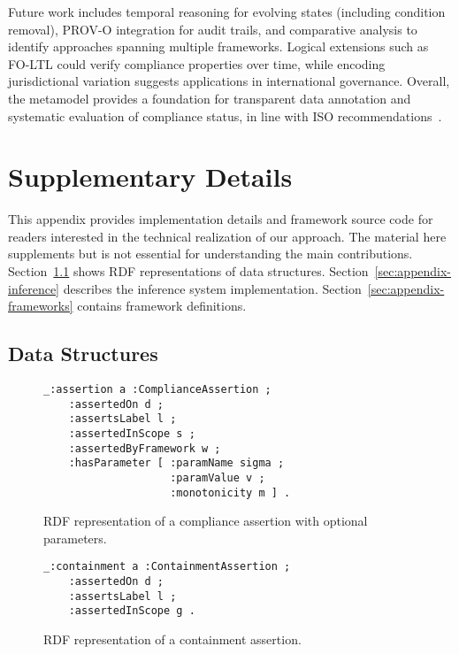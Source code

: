 \documentclass{IOS-Book-Article}
\begin{document}
Future work includes temporal reasoning for evolving states (including condition removal), PROV-O integration for audit trails, and comparative analysis to identify approaches spanning multiple frameworks. Logical extensions such as FO-LTL could verify compliance properties over time, while encoding jurisdictional variation suggests applications in international governance. Overall, the metamodel provides a foundation for transparent data annotation and systematic evaluation of compliance status, in line with ISO recommendations~\cite{iso19944,iso38505,iso27001}.





\newpage
\appendix
\section{Supplementary Details}

This appendix provides implementation details and framework source code for readers interested in the technical realization of our approach. The material here supplements but is not essential for understanding the main contributions. Section~\ref{sec:appendix-rdf} shows RDF representations of data structures. Section~\ref{sec:appendix-inference} describes the inference system implementation. Section~\ref{sec:appendix-frameworks} contains framework definitions.

\subsection{Data Structures}\label{sec:appendix-rdf}

\begin{figure}[ht]
\begin{lstlisting}[basicstyle=\ttfamily, frame=none]
_:assertion a :ComplianceAssertion ;
    :assertedOn d ;
    :assertsLabel l ;
    :assertedInScope s ;
    :assertedByFramework w ;
    :hasParameter [ :paramName sigma ;
                    :paramValue v ;
                    :monotonicity m ] .
\end{lstlisting}
\caption{RDF representation of a compliance assertion with optional parameters.}
\label{fig:appendix-compliance-assertion}
\end{figure}

\begin{figure}[ht]
\begin{lstlisting}[basicstyle=\ttfamily, frame=none]
_:containment a :ContainmentAssertion ;
    :assertedOn d ;
    :assertsLabel l ;
    :assertedInScope g .
\end{lstlisting}
\caption{RDF representation of a containment assertion.}
\label{fig:appendix-containment-assertion}
\end{figure}
\end{document}
